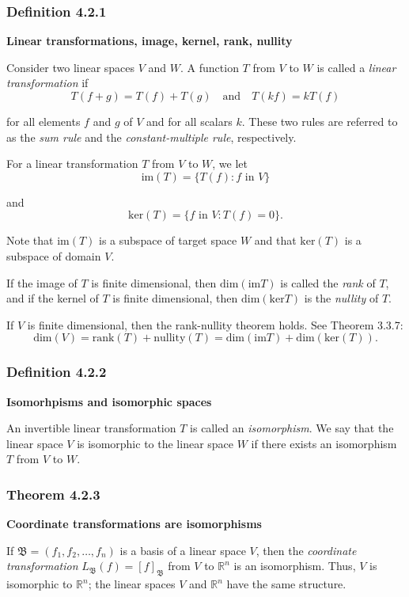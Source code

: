 \documentclass{report}
\begin{document}
\subsubsection*{Definition 4.2.1}
\par\noindent\textbf{Linear transformations, image, kernel, rank, nullity}
\par\noindent Consider two linear spaces $V$ and $W$. A function $T$ from $V$ to $W$ is called a \textit{linear transformation} if
\[T(f+g)=T(f)+T(g)\quad{}\textrm{and}\quad{}T(kf)=kT(f)\]
\par\noindent for all elements $f$ and $g$ of $V$ and for all scalars $k$. These two rules are referred to as the \textit{sum rule} and the \textit{constant-multiple rule}, respectively.
\par\noindent For a linear transformation $T$ from $V$ to $W$, we let
\[\textrm{im}(T)=\{T(f):f\textrm{ in }V\}\]
\par\noindent and
\[\textrm{ker}(T)=\{f\textrm{ in }V:T(f)=0\}.\]
\par\noindent Note that $\textrm{im}(T)$ is a subspace of target space $W$ and that $\textrm{ker}(T)$ is a subspace of domain $V$.
\par\noindent If the image of $T$ is finite dimensional, then $\textrm{dim}(\textrm{im}T)$ is called the \textit{rank} of $T$, and if the kernel of $T$ is finite dimensional, then $\textrm{dim}(\textrm{ker}T)$ is the \textit{nullity} of $T$.
\par\noindent If $V$ is finite dimensional, then the rank-nullity theorem holds. See Theorem 3.3.7:
\[\textrm{dim}(V)=\textrm{rank}(T)+\textrm{nullity}(T)=\textrm{dim}(\textrm{im}T)+\textrm{dim}(\textrm{ker}(T)).\]
\subsubsection*{Definition 4.2.2}
\par\noindent\textbf{Isomorhpisms and isomorphic spaces}
\par\noindent An invertible linear transformation $T$ is called an \textit{isomorphism}. We say that the linear space $V$ is isomorphic to the linear space $W$ if there exists an isomorphism $T$ from $V$ to $W$.
\subsubsection*{Theorem 4.2.3}
\par\noindent\textbf{Coordinate transformations are isomorphisms}
\par\noindent If $\mathfrak{B}=(f_{1},f_{2},\ldots{},f_{n})$ is a basis of a linear space $V$, then the \textit{coordinate transformation} $L_{\mathfrak{B}}(f)=\left[f\right]_{\mathfrak{B}}$ from $V$ to $\mathbb{R}^{n}$ is an isomorphism. Thus, $V$ is isomorphic to $\mathbb{R}^{n}$; the linear spaces $V$ and $\mathbb{R}^{n}$ have the same structure.
\end{document}
